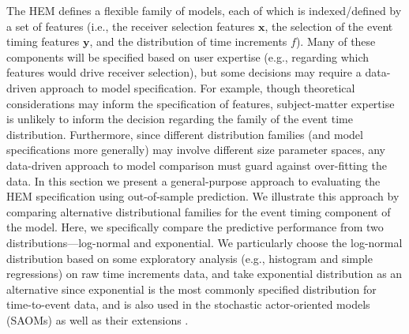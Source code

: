 \documentclass[ba]{imsart}
\numberwithin{equation}{section}
\theoremstyle{plain}
\begin{document}
	The HEM defines a flexible family of models, each of which is indexed/defined by a set of features (i.e., the receiver selection features $\boldsymbol{x}$, the selection of the event timing features $\boldsymbol{y}$, and the distribution of time increments $f$). Many of these components will be specified based on user expertise (e.g., regarding which features would drive receiver selection), but some decisions may require a data-driven approach to model specification. For example, though theoretical considerations may inform the specification of features, subject-matter expertise is unlikely to inform the decision regarding the family of the event time distribution. Furthermore, since different distribution families (and model specifications more generally) may involve different size parameter spaces, any data-driven approach to model comparison must guard against over-fitting the data. In this section we present a general-purpose approach to evaluating the HEM specification using out-of-sample prediction. We illustrate this approach by comparing alternative distributional families for the event timing component of the model. Here, we specifically compare the predictive performance from two distributions---log-normal and exponential. We particularly choose the log-normal distribution based on some exploratory analysis (e.g., histogram and simple regressions) on raw time increments data, and take exponential distribution as an alternative since exponential is the most commonly specified distribution for time-to-event data, and is also used in the stochastic actor-oriented models (SAOMs) \citep{snijders1996stochastic} as well as their extensions \citep{snijders2007modeling}. 
\end{document}
